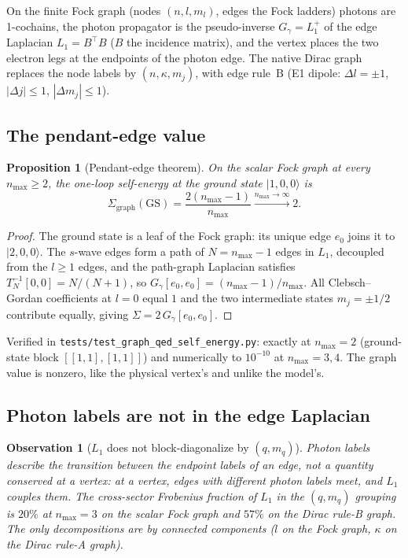 \documentclass[11pt]{article}
\newtheorem{proposition}{Proposition}
\newtheorem{observation}{Observation}
\begin{document}
On the finite Fock graph (nodes $(n, l, m_l)$, edges the Fock ladders)
photons are 1-cochains, the photon propagator is the pseudo-inverse
$G_\gamma = L_1^+$ of the edge Laplacian $L_1 = B^\top B$ ($B$ the
incidence matrix), and the vertex places the two
electron legs at the endpoints of the photon edge.  The native Dirac
graph replaces the node labels by $(n, \kappa, m_j)$, with edge rule~B
(E1 dipole: $\Delta l = \pm 1$, $|\Delta j| \le 1$, $|\Delta m_j| \le 1$).

\subsection{The pendant-edge value}

\begin{proposition}[Pendant-edge theorem]
\label{prop:pendant_edge}
On the scalar Fock graph at every $n_{\max} \ge 2$, the one-loop
self-energy at the ground state $|1, 0, 0\rangle$ is
\[
   \Sigma_{\mathrm{graph}}(\mathrm{GS}) = \frac{2(n_{\max} - 1)}{n_{\max}}
   \xrightarrow{n_{\max} \to \infty} 2.
\]
\end{proposition}

\begin{proof}
The ground state is a leaf of the Fock graph: its unique edge $e_0$
joins it to $|2, 0, 0\rangle$.  The $s$-wave edges form a path of
$N = n_{\max} - 1$ edges in $L_1$, decoupled from the $l \ge 1$ edges, and
the path-graph Laplacian satisfies $T_N^{-1}[0,0] = N/(N+1)$, so
$G_\gamma[e_0, e_0] = (n_{\max}-1)/n_{\max}$.  All Clebsch--Gordan
coefficients at $l = 0$ equal $1$ and the two intermediate states
$m_j = \pm 1/2$ contribute equally, giving
$\Sigma = 2\,G_\gamma[e_0, e_0]$.
\end{proof}

\noindent Verified in \texttt{tests/test\_graph\_qed\_self\_energy.py}:
exactly at $n_{\max} = 2$ (ground-state block $[[1,1],[1,1]]$) and
numerically to $10^{-10}$ at $n_{\max} = 3, 4$.  The graph value is
nonzero, like the physical vertex's and unlike the model's.

\subsection{Photon labels are not in the edge Laplacian}

\begin{observation}[$L_1$ does not block-diagonalize by $(q, m_q)$]
\label{obs:L1}
Photon labels describe the transition between the endpoint labels of an
edge, not a quantity conserved at a vertex: at a vertex, edges with
different photon labels meet, and $L_1$ couples them.  The cross-sector
Frobenius fraction of $L_1$ in the $(q, m_q)$ grouping is $20\%$ at
$n_{\max} = 3$ on the scalar Fock graph and $57\%$ on the Dirac rule-B
graph.  The only decompositions are by connected components ($l$ on the
Fock graph, $\kappa$ on the Dirac rule-A graph).
\end{observation}
\end{document}
